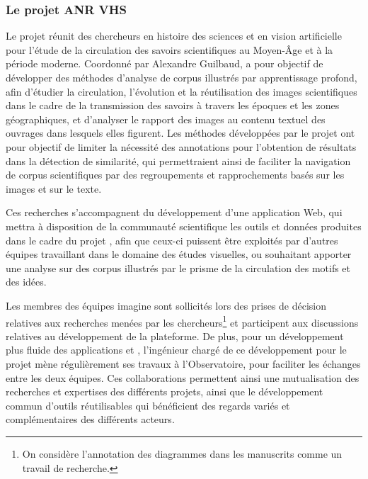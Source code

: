         \subsubsection{Le projet ANR VHS}
Le projet \vhs réunit des chercheurs en histoire des sciences et en vision artificielle pour l'étude de la circulation des savoirs scientifiques au Moyen-Âge et à la période moderne. Coordonné par Alexandre Guilbaud, \vhs a pour objectif de développer des méthodes d'analyse de corpus illustrés par apprentissage profond, afin d'étudier la circulation, l'évolution et la réutilisation des images scientifiques dans le cadre de la transmission des savoirs à travers les époques et les zones géographiques, et d'analyser le rapport des images au contenu textuel des ouvrages dans lesquels elles figurent. Les méthodes développées par le projet ont pour objectif de limiter la nécessité des annotations pour l'obtention de résultats dans la détection de similarité, qui permettraient ainsi de faciliter la navigation de corpus scientifiques par des regroupements et rapprochements basés sur les images et sur le texte.

Ces recherches s'accompagnent du développement d'une application Web, qui mettra à disposition de la communauté scientifique les outils et données produites dans le cadre du projet \vhs, afin que ceux-ci puissent être exploités par d'autres équipes travaillant dans le domaine des études visuelles, ou souhaitant apporter une analyse sur des corpus illustrés par le prisme de la circulation des motifs et des idées. 

 Les membres des équipes \acrshort{imagine} sont sollicités lors des prises de décision relatives aux recherches menées par les chercheurs\footnote{On considère l'annotation des diagrammes dans les manuscrits comme un travail de recherche.} et participent aux discussions relatives au développement de la plateforme. De plus, pour un développement plus fluide des applications \vhs et \eida, l'ingénieur chargé de ce développement pour le projet \vhs mène régulièrement ses travaux à l'Observatoire, pour faciliter les échanges entre les deux équipes. Ces collaborations permettent ainsi une mutualisation des recherches et expertises des différents projets, ainsi que le développement commun d'outils réutilisables qui bénéficient des regards variés et complémentaires des différents acteurs.